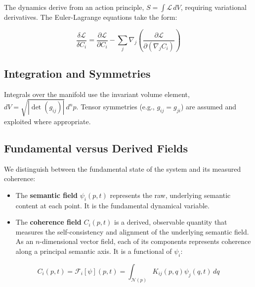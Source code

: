 The dynamics derive from an action principle, \(S = \int \mathcal{L} \, dV\), requiring variational derivatives. The Euler-Lagrange equations take the form:

\begin{equation}
\frac{\delta \mathcal{L}}{\delta C_i} = \frac{\partial \mathcal{L}}{\partial C_i} - \sum_j \nabla_j \left( \frac{\partial \mathcal{L}}{\partial (\nabla_j C_i)} \right)
\end{equation}


\subsection{Integration and Symmetries}
\label{sec:integration_and_symmetries}

Integrals over the manifold use the invariant volume element, \(dV = \sqrt{|\det(g_{ij})|} \, d^n p\). Tensor symmetries (e.g., \(g_{ij} = g_{ji}\)) are assumed and exploited where appropriate.


\subsection{Fundamental versus Derived Fields}
\label{sec:fundamental_versus_derived_fields}

We distinguish between the fundamental state of the system and its measured coherence:

\begin{itemize}

    \item The \textbf{semantic field} \(\psi_i(p,t)\) represents the raw, underlying semantic content at each point. It is the fundamental dynamical variable.

    \item The \textbf{coherence field} \(C_i(p,t)\) is a derived, observable quantity that measures the self-consistency and alignment of the underlying semantic field. As an \(n\)-dimensional vector field, each of its components represents coherence along a principal semantic axis. It is a functional of \(\psi_i\):

\end{itemize}

\begin{equation}
C_i(p,t) = \mathcal{F}_i[\psi](p,t) = \int_{\mathcal{N}(p)} K_{ij}(p,q) \psi_j(q,t) \, dq
\end{equation}

